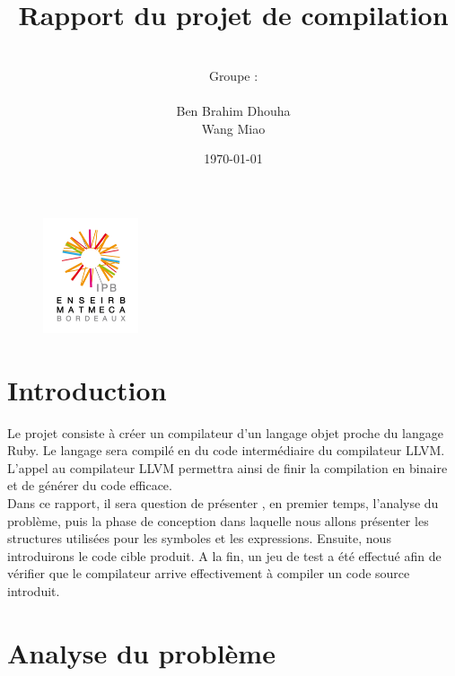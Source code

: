\documentclass{article}
\date{\vspace{3 cm} \today}
\author{\vspace{4 cm} \\ Groupe :\\ \\Ben Brahim Dhouha\\Wang Miao }
\title{Rapport du projet de compilation \\ }
\begin{document}
\newenvironment{narrow}[2]{%
\begin{list}{}{%
\setlength{\topsep}{0pt}%
\setlength{\leftmargin}{#1}%
\setlength{\rightmargin}{#2}%
\setlength{\listparindent}{\parindent}%
\setlength{\itemindent}{\parindent}%
\setlength{\parsep}{\parskip}%
}%
\item[]}{\end{list}}


\thispagestyle{empty}
\begin{figure}
\includegraphics[width=0.25\textwidth]{enseirb-matmeca.jpg}
\end{figure}

\maketitle




\newpage


\section*{Introduction}


Le projet consiste à créer un compilateur d'un langage objet proche du langage Ruby. Le langage sera compilé en du code intermédiaire du compilateur LLVM. L'appel au compilateur LLVM permettra ainsi de finir la compilation en binaire et de générer du code efficace. \\

Dans ce rapport, il sera question de présenter , en premier temps, l'analyse du problème, puis la phase de conception dans laquelle nous allons présenter les structures utilisées pour les symboles et les expressions. Ensuite, nous introduirons le code cible produit.
A la fin, un jeu de test a été effectué afin de vérifier que le compilateur arrive effectivement à compiler un code source introduit.

\newpage
\tableofcontents

\newpage
\section{Analyse du problème}
\end{document}
